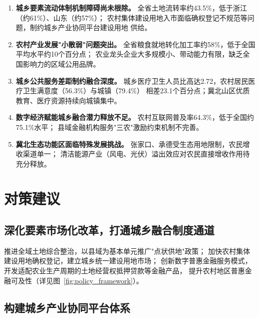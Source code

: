 \documentclass[12pt, a4paper, twoside]{ctexart}
\begin{document}
\begin{enumerate}[leftmargin=2em, itemsep=4pt]
  \item \textbf{城乡要素流动体制机制障碍尚未根除。}
        全省土地流转率约43.5\%，低于浙江（约61\%）、山东（约57\%）；
        农村集体建设用地入市面临确权登记不规范等问题，制约城乡产业协同平台建设用地
        供给。

  \item \textbf{农村产业发展"小散弱"问题突出。}
        全省粮食就地转化加工率约58\%，低于全国平均水平约10个百分点；
        农业龙头企业大多规模小、带动能力有限，缺乏全国影响力的区域公用品牌。

  \item \textbf{城乡公共服务差距制约融合深度。}
        城乡医疗卫生人员比高达2.72，农村居民医疗卫生满意度（56.3\%）与城镇（79.4\%）
        相差23.1个百分点；冀北山区优质教育、医疗资源持续向城镇集中。

  \item \textbf{数字经济赋能城乡融合潜力释放不足。}
        农村互联网普及率64.3\%，低于全国约75.1\%水平；
        县域金融机构服务"三农"激励约束机制不完善。

  \item \textbf{冀北生态功能区面临特殊发展挑战。}
        张家口、承德受生态用地限制，农民增收渠道单一；
        清洁能源产业（风电、光伏）溢出效应对农民直接增收作用待充分释放。
\end{enumerate}

\section{对策建议}

\subsection{深化要素市场化改革，打通城乡融合制度通道}

推进全域土地综合整治，以县域为基本单元推广"点状供地"政策；
加快农村集体建设用地确权登记，建立城乡统一建设用地市场；
创新数字普惠金融服务模式，开发适配农业生产周期的土地经营权抵押贷款等金融产品，
提升农村地区普惠金融可及性（详见图~\ref{fig:policy_framework}）。

\subsection{构建城乡产业协同平台体系}
\end{document}
